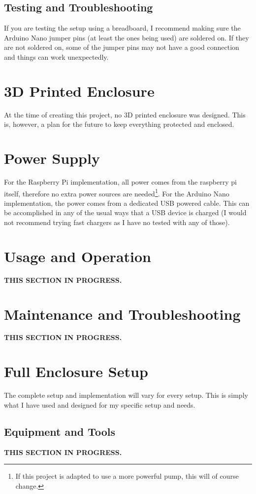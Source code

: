 \documentclass{article}
\begin{document}
\begin{multicols}{2}
		\subsection{Testing and Troubleshooting}
		If you are testing the setup using a breadboard, I recommend making sure the Arduino Nano jumper pins (at least the ones being used) are soldered on. If they are not soldered on, some of the jumper pins may not have a good connection and things can work unexpectedly.
		
		\section{3D Printed Enclosure}
		At the time of creating this project, no 3D printed enclosure was designed. This is, however, a plan for the future to keep everything protected and enclosed.
		
		\section{Power Supply}
		For the Raspberry Pi implementation, all power comes from the raspberry pi itself, therefore no extra power sources are needed\footnote{If this project is adapted to use a more powerful pump, this will of course change.}. For the Arduino Nano implementation, the power comes from a dedicated USB powered cable. This can be accomplished in any of the usual ways that a USB device is charged (I would not recommend trying fast chargers as I have no tested with any of those).
		
		\section{Usage and Operation}
		\textbf{THIS SECTION IN PROGRESS.}
		
		\section{Maintenance and Troubleshooting}
		\textbf{THIS SECTION IN PROGRESS.}
		
		\section{Full Enclosure Setup}		
		The complete setup and implementation will vary for every setup. This is simply what I have used and designed for my specific setup and needs.
		
			\subsection{Equipment and Tools}
			\textbf{THIS SECTION IN PROGRESS.}
			

\end{multicols}
\end{document}
